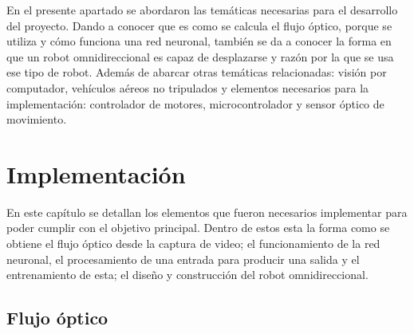 \documentclass{iccmemoria}
\begin{document}
\begin{table}[H]
\caption[Paquete de datos de movimiento \emph{mouse} PS/2.]{Paquete de datos del movimiento del \emph{mouse}.}\label{tab:ps/2 package}
\end{table}

En el presente apartado se abordaron las temáticas necesarias para el desarrollo del proyecto. Dando a conocer que es como se calcula el flujo óptico, porque se utiliza y cómo funciona una red neuronal, también se da a conocer la forma en que un robot omnidireccional es capaz de desplazarse y razón por la que se usa ese tipo de robot. Además de abarcar otras temáticas relacionadas: visión por computador, vehículos aéreos no tripulados y elementos necesarios para la implementación: controlador de motores, microcontrolador y sensor óptico de movimiento.\\

\chapter{Implementación}

En este capítulo se detallan los elementos que fueron necesarios implementar para poder cumplir con el objetivo principal. Dentro de estos esta la forma como se obtiene el flujo óptico desde la captura de video; el funcionamiento de la red neuronal, el procesamiento de una entrada para producir una salida y el entrenamiento de esta; el diseño y construcción del robot omnidireccional.\\
 
\section{Flujo óptico}
\end{document}
